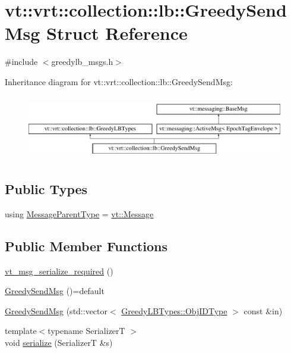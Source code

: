 \hypertarget{structvt_1_1vrt_1_1collection_1_1lb_1_1_greedy_send_msg}{}\section{vt\+:\+:vrt\+:\+:collection\+:\+:lb\+:\+:Greedy\+Send\+Msg Struct Reference}
\label{structvt_1_1vrt_1_1collection_1_1lb_1_1_greedy_send_msg}


{\ttfamily \#include $<$greedylb\+\_\+msgs.\+h$>$}

Inheritance diagram for vt\+:\+:vrt\+:\+:collection\+:\+:lb\+:\+:Greedy\+Send\+Msg\+:\begin{figure}[H]
\begin{center}
\leavevmode
\includegraphics[height=2.847458cm]{structvt_1_1vrt_1_1collection_1_1lb_1_1_greedy_send_msg}
\end{center}
\end{figure}
\subsection*{Public Types}
\begin{DoxyCompactItemize}
\item 
using \hyperlink{structvt_1_1vrt_1_1collection_1_1lb_1_1_greedy_send_msg_a91c78d20e334e20ba9bcc8f969d48e51}{Message\+Parent\+Type} = \hyperlink{namespacevt_a3a3ddfef40b4c90915fa43cdd5f129ea}{vt\+::\+Message}
\end{DoxyCompactItemize}
\subsection*{Public Member Functions}
\begin{DoxyCompactItemize}
\item 
\hyperlink{structvt_1_1vrt_1_1collection_1_1lb_1_1_greedy_send_msg_a070db44a358504019e63bab9a679bbbd}{vt\+\_\+msg\+\_\+serialize\+\_\+required} ()
\item 
\hyperlink{structvt_1_1vrt_1_1collection_1_1lb_1_1_greedy_send_msg_a7fdf684e6c431b3b7a412a137d2fc404}{Greedy\+Send\+Msg} ()=default
\item 
\hyperlink{structvt_1_1vrt_1_1collection_1_1lb_1_1_greedy_send_msg_a6d542b55b114ca8066846037562fe483}{Greedy\+Send\+Msg} (std\+::vector$<$ \hyperlink{structvt_1_1vrt_1_1collection_1_1lb_1_1_greedy_l_b_types_ae22670acd689e4ff83315fac2e4acb5e}{Greedy\+L\+B\+Types\+::\+Obj\+I\+D\+Type} $>$ const \&in)
\item 
{\footnotesize template$<$typename SerializerT $>$ }\\void \hyperlink{structvt_1_1vrt_1_1collection_1_1lb_1_1_greedy_send_msg_a28468c323e55f526621b5d52ed748a8b}{serialize} (SerializerT \&s)
\end{DoxyCompactItemize}
